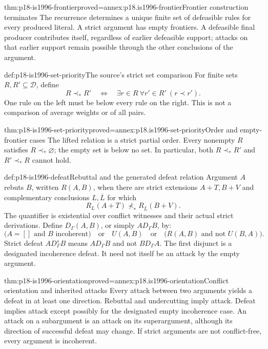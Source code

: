 \begin{hbtheorem}{thm:p18-is1996-frontier}{proved=annex:p18.is1996-frontier}{Frontier construction terminates}
The recurrence determines a unique finite set of defeasible rules
for every produced literal. A strict argument has empty frontiers.
A defeasible final producer contributes itself, regardless of
earlier defeasible support; attacks on that earlier support
remain possible through the other conclusions of the argument.
\end{hbtheorem}

\begin{hbdefinition}{def:p18-is1996-set-priority}{The source's strict set comparison}
For finite sets \(R,R'\subseteq\mathcal D\), define
\[
R\prec_*R'
\quad\Longleftrightarrow\quad
\exists r\in R\ \forall r'\in R'\ (r\prec r').
\]
One rule on the left must be below every rule on the right.
This is not a comparison of average weights or of all pairs.
\end{hbdefinition}

\begin{hbtheorem}{thm:p18-is1996-set-priority}{proved=annex:p18.is1996-set-priority}{Order and empty-frontier cases}
The lifted relation is a strict partial order.
Every nonempty \(R\) satisfies \(R\prec_*\varnothing\);
the empty set is below no set.
In particular, both \(R\prec_*R'\) and \(R'\prec_*R\)
cannot hold.
\end{hbtheorem}

\begin{hbdefinition}{def:p18-is1996-defeat}{Rebuttal and the generated defeat relation}
Argument \(A\) rebuts \(B\), written \(R(A,B)\), when there
are strict extensions \(A+T,B+V\) and complementary conclusions
\(L,\overline L\) for which
\[
R_L(A+T)\not\prec_*R_{\overline L}(B+V).
\]
The quantifier is existential over conflict witnesses and their
actual strict derivations.
Define \(D_\Gamma(A,B)\), or simply \(A D_\Gamma B\), by:
\[
\bigl(A=[]\text{ and }B\text{ incoherent}\bigr)
\quad\text{or}\quad U(A,B)
\quad\text{or}\quad\bigl(R(A,B)\text{ and not }U(B,A)\bigr).
\]
Strict defeat \(A D_\Gamma^s B\) means
\(A D_\Gamma B\) and not \(B D_\Gamma A\).
The first disjunct is a designated incoherence defeat.
It need not itself be an attack by the empty argument.
\end{hbdefinition}

\begin{hbtheorem}{thm:p18-is1996-orientation}{proved=annex:p18.is1996-orientation}{Conflict orientation and inherited attacks}
Every attack between two arguments yields a defeat in at least
one direction. Rebuttal and undercutting imply attack.
Defeat implies attack except possibly for the designated empty
incoherence case.
An attack on a subargument is an attack on its superargument,
although its direction of successful defeat may change.
If strict arguments are not conflict-free, every argument is incoherent.
\end{hbtheorem}

